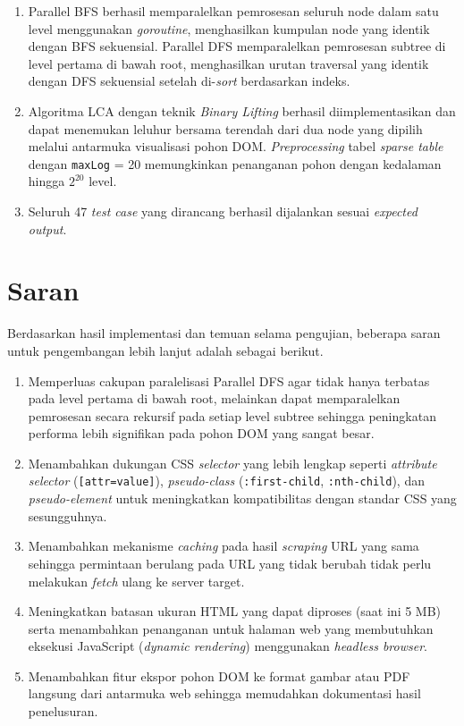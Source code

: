 \begin{enumerate}
    \item Parallel BFS berhasil memparalelkan pemrosesan seluruh node dalam satu level menggunakan \textit{goroutine}, menghasilkan kumpulan node yang identik dengan BFS sekuensial. Parallel DFS memparalelkan pemrosesan subtree di level pertama di bawah root, menghasilkan urutan traversal yang identik dengan DFS sekuensial setelah di-\textit{sort} berdasarkan indeks.
 
    \item Algoritma LCA dengan teknik \textit{Binary Lifting} berhasil diimplementasikan dan dapat menemukan leluhur bersama terendah dari dua node yang dipilih melalui antarmuka visualisasi pohon DOM. \textit{Preprocessing} tabel \textit{sparse table} dengan \texttt{maxLog} = 20 memungkinkan penanganan pohon dengan kedalaman hingga $2^{20}$ level.
 
    \item Seluruh 47 \textit{test case} yang dirancang berhasil dijalankan sesuai \textit{expected output}.
\end{enumerate}
 
\section{Saran}
 
Berdasarkan hasil implementasi dan temuan selama pengujian, beberapa saran untuk pengembangan lebih lanjut adalah sebagai berikut.
 
\begin{enumerate}
    \item Memperluas cakupan paralelisasi Parallel DFS agar tidak hanya terbatas pada level pertama di bawah root, melainkan dapat memparalelkan pemrosesan secara rekursif pada setiap level subtree sehingga peningkatan performa lebih signifikan pada pohon DOM yang sangat besar.
 
    \item Menambahkan dukungan CSS \textit{selector} yang lebih lengkap seperti \textit{attribute selector} (\texttt{[attr=value]}), \textit{pseudo-class} (\texttt{:first-child}, \texttt{:nth-child}), dan \textit{pseudo-element} untuk meningkatkan kompatibilitas dengan standar CSS yang sesungguhnya.
 
    \item Menambahkan mekanisme \textit{caching} pada hasil \textit{scraping} URL yang sama sehingga permintaan berulang pada URL yang tidak berubah tidak perlu melakukan \textit{fetch} ulang ke server target.
 
    \item Meningkatkan batasan ukuran HTML yang dapat diproses (saat ini 5 MB) serta menambahkan penanganan untuk halaman web yang membutuhkan eksekusi JavaScript (\textit{dynamic rendering}) menggunakan \textit{headless browser}.
 
    \item Menambahkan fitur ekspor pohon DOM ke format gambar atau PDF langsung dari antarmuka web sehingga memudahkan dokumentasi hasil penelusuran.
\end{enumerate}